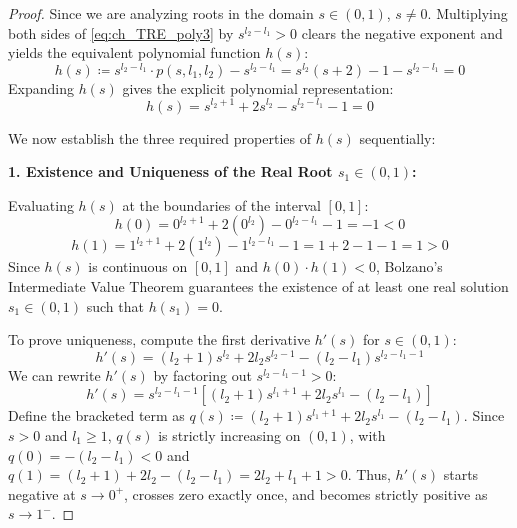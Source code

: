\begin{proof}
Since we are analyzing roots in the domain $s \in (0,1)$, $s \neq 0$. Multiplying both sides of \eqref{eq:ch_TRE_poly3} by $s^{l_2-l_1} > 0$ clears the negative exponent and yields the equivalent polynomial function $h(s)$:
\begin{equation}\label{eq:ch_TRE_poly3cleared}
	h(s) \coloneqq s^{l_2-l_1} \cdot p(s, l_1, l_2) - s^{l_2-l_1} = s^{l_2}(s+2) - 1 - s^{l_2-l_1} = 0
\end{equation}
Expanding $h(s)$ gives the explicit polynomial representation:
\begin{equation}\label{eq:h_expanded}
	h(s) = s^{l_2+1} + 2s^{l_2} - s^{l_2-l_1} - 1 = 0
\end{equation}

We now establish the three required properties of $h(s)$ sequentially:

\vspace{0.5em}
\noindent\textbf{1. Existence and Uniqueness of the Real Root $s_1 \in (0,1)$:}

Evaluating $h(s)$ at the boundaries of the interval $[0,1]$:
\begin{equation}
	h(0) = 0^{l_2+1} + 2(0^{l_2}) - 0^{l_2-l_1} - 1 = -1 < 0
\end{equation}
\begin{equation}
	h(1) = 1^{l_2+1} + 2(1^{l_2}) - 1^{l_2-l_1} - 1 = 1 + 2 - 1 - 1 = 1 > 0
\end{equation}
Since $h(s)$ is continuous on $[0,1]$ and $h(0) \cdot h(1) < 0$, Bolzano's Intermediate Value Theorem guarantees the existence of at least one real solution $s_1 \in (0,1)$ such that $h(s_1) = 0$.

To prove uniqueness, compute the first derivative $h'(s)$ for $s \in (0,1)$:
\begin{equation}\label{eq:h_prime}
	h'(s) = (l_2+1)s^{l_2} + 2l_2 s^{l_2-1} - (l_2-l_1)s^{l_2-l_1-1}
\end{equation}
We can rewrite $h'(s)$ by factoring out $s^{l_2-l_1-1} > 0$:
\begin{equation}
	h'(s) = s^{l_2-l_1-1} \left[ (l_2+1)s^{l_1+1} + 2l_2 s^{l_1} - (l_2-l_1) \right]
\end{equation}
Define the bracketed term as $q(s) \coloneqq (l_2+1)s^{l_1+1} + 2l_2 s^{l_1} - (l_2-l_1)$. Since $s > 0$ and $l_1 \ge 1$, $q(s)$ is strictly increasing on $(0,1)$, with $q(0) = -(l_2-l_1) < 0$ and $q(1) = (l_2+1) + 2l_2 - (l_2-l_1) = 2l_2 + l_1 + 1 > 0$. Thus, $h'(s)$ starts negative at $s \to 0^+$, crosses zero exactly once, and becomes strictly positive as $s \to 1^-$. 


\end{proof}
